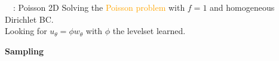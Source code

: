 \begin{frame}{\appendixname~\theappendixframenumber~: Poisson 2D}
	 Solving the \textcolor{orange}{Poisson problem} with $f=1$ and homogeneous Dirichlet BC. \\
	 Looking for $u_\theta = \phi w_\theta$ with $\phi$ the levelset learned. 
	
	\begin{center}
		\begin{minipage}{0.32\linewidth}
			\textbf{Sampling}
			
			\vspace{-8pt}
			\centering
		\end{minipage} \qquad 
		\begin{minipage}{0.32\linewidth}
			\centering
		\end{minipage} 
	\end{center}
	
	\begin{center}
	\end{center}
\end{frame}
\addtocounter{appendixframenumber}{1}
